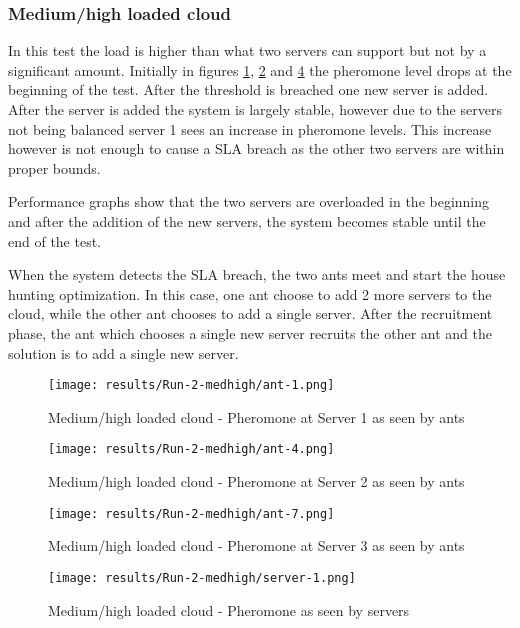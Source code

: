\subsubsection{Medium/high loaded cloud}

In this test the load is higher than what two servers can support but not by a significant amount. Initially in figures \ref{fig:2serv-ant1-medhigh}, \ref{fig:2serv-ant5-medhigh} and \ref{fig:2serv-pher-medhigh} the pheromone level drops at the beginning of the test. After the threshold is breached one new server is added. After the server is added the system is largely stable, however due to the servers not being balanced server 1 sees an increase in pheromone levels. This increase however is not enough to cause a SLA breach as the other two servers are within proper bounds.

Performance graphs show that the two servers are overloaded in the beginning and after the addition of the new servers, the system becomes stable until the end of the test.

When the system detects the SLA breach, the two ants meet and start the house hunting optimization. In this case, one ant choose to add 2 more servers to the cloud, while the other ant chooses to add a single server. After the recruitment phase, the ant which chooses a single new server recruits the other ant and the solution is to add a single new server.

\begin{figure}[!ht]
	\centering
		\texttt{[image: results/Run-2-medhigh/ant-1.png]}
	\caption{Medium/high loaded cloud - Pheromone at Server 1 as seen by ants}
	\label{fig:2serv-ant1-medhigh}
\end{figure}

\begin{figure}
	\centering
		\texttt{[image: results/Run-2-medhigh/ant-4.png]}
	\caption{Medium/high loaded cloud - Pheromone at Server 2 as seen by ants}
	\label{fig:2serv-ant5-medhigh}
\end{figure}

\begin{figure}
	\centering
		\texttt{[image: results/Run-2-medhigh/ant-7.png]}
	\caption{Medium/high loaded cloud - Pheromone at Server 3 as seen by ants}
	\label{fig:2serv-ant9-medhigh}
\end{figure}

\begin{figure}
	\centering
		\texttt{[image: results/Run-2-medhigh/server-1.png]}
	\caption{Medium/high loaded cloud - Pheromone as seen by servers}
	\label{fig:2serv-pher-medhigh}
\end{figure}

